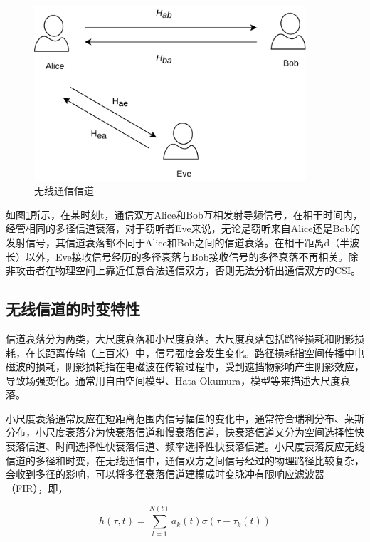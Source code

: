 \documentclass[master]{seuthesis} %
\begin{document}
\begin{Main}
\begin{figure}[htbp!]
    \centering \includegraphics[width=0.9\textwidth]{images/channel} 
    \caption{无线通信信道}
    \label{wireless-channel}
\end{figure}

如图\ref{wireless-channel}所示，在某时刻t，通信双方Alice和Bob互相发射导频信号，在相干时间内，经管相同的多径信道衰落，对于窃听者Eve来说，无论是窃听来自Alice还是Bob的发射信号，其信道衰落都不同于Alice和Bob之间的信道衰落。在相干距离d（半波长）以外，Eve接收信号经历的多径衰落与Bob接收信号的多径衰落不再相关。除非攻击者在物理空间上靠近任意合法通信双方，否则无法分析出通信双方的CSI\cite{sasaoka2009secret}。

\subsection{无线信道的时变特性}


信道衰落分为两类，大尺度衰落和小尺度衰落。大尺度衰落包括路径损耗和阴影损耗，在长距离传输（上百米）中，信号强度会发生变化。路径损耗指空间传播中电磁波的损耗，阴影损耗指在电磁波在传输过程中，受到遮挡物影响产生阴影效应，导致场强变化。通常用自由空间模型、Hata-Okumura，模型等来描述大尺度衰落。

小尺度衰落通常反应在短距离范围内信号幅值的变化中，通常符合瑞利分布、莱斯分布，小尺度衰落分为快衰落信道和慢衰落信道，快衰落信道又分为空间选择性快衰落信道、时间选择性快衰落信道、频率选择性快衰落信道。小尺度衰落反应无线信道的多径和时变，在无线通信中，通信双方之间信号经过的物理路径比较复杂，会收到多径的影响，可以将多径衰落信道建模成时变脉冲有限响应滤波器（FIR）\cite{liu2012exploiting}，即，

\begin{equation}
    h(\tau, t) = \sum_{l = 1}^{N(t)} a_k(t) \sigma(\tau - \tau_k(t))
\end{equation}


\end{Main}
\end{document}

